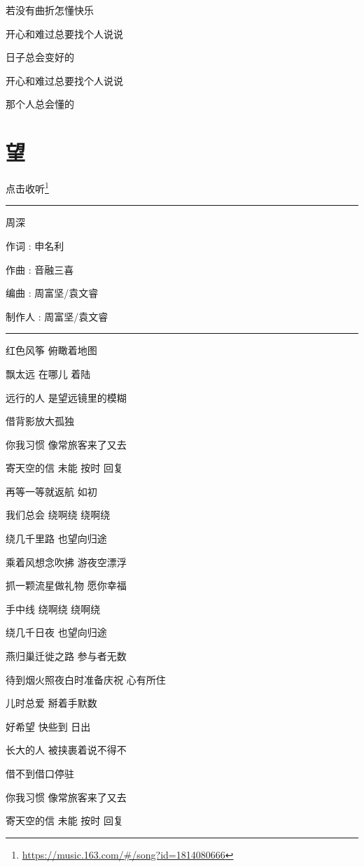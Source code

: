 \documentclass[]{ctexbook}
\renewcommand{\href}[2]{#2\footnote{\url{#1}}}
\begin{document}
若没有曲折怎懂快乐

开心和难过总要找个人说说

日子总会变好的

开心和难过总要找个人说说

那个人总会懂的

\section*{望}\label{hope}


\href{https://music.163.com/\#/song?id=1814080666}{点击收听}

\begin{center}\rule{0.5\linewidth}{0.5pt}\end{center}

周深

作词 : 申名利

作曲 : 音融三喜

编曲 : 周富坚/袁文睿

制作人 : 周富坚/袁文睿

\begin{center}\rule{0.5\linewidth}{0.5pt}\end{center}

红色风筝 俯瞰着地图

飘太远 在哪儿 着陆

远行的人 是望远镜里的模糊

借背影放大孤独

你我习惯 像常旅客来了又去

寄天空的信 未能 按时 回复

再等一等就返航 如初

我们总会 绕啊绕 绕啊绕

绕几千里路 也望向归途

乘着风想念吹拂 游夜空漂浮

抓一颗流星做礼物 愿你幸福

手中线 绕啊绕 绕啊绕

绕几千日夜 也望向归途

燕归巢迁徙之路 参与者无数

待到烟火照夜白时准备庆祝 心有所住

儿时总爱 掰着手默数

好希望 快些到 日出

长大的人 被挟裹着说不得不

借不到借口停驻

你我习惯 像常旅客来了又去

寄天空的信 未能 按时 回复
\end{document}
